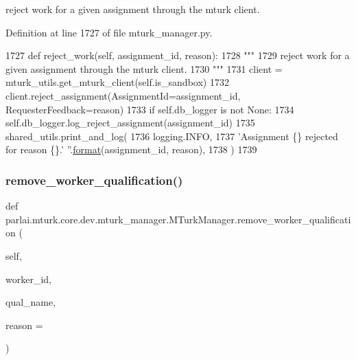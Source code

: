 \begin{DoxyVerb}reject work for a given assignment through the mturk client.
\end{DoxyVerb}
 

Definition at line 1727 of file mturk\+\_\+manager.\+py.


\begin{DoxyCode}
1727     \textcolor{keyword}{def }reject\_work(self, assignment\_id, reason):
1728         \textcolor{stringliteral}{"""}
1729 \textcolor{stringliteral}{        reject work for a given assignment through the mturk client.}
1730 \textcolor{stringliteral}{        """}
1731         client = mturk\_utils.get\_mturk\_client(self.is\_sandbox)
1732         client.reject\_assignment(AssignmentId=assignment\_id, RequesterFeedback=reason)
1733         \textcolor{keywordflow}{if} self.db\_logger \textcolor{keywordflow}{is} \textcolor{keywordflow}{not} \textcolor{keywordtype}{None}:
1734             self.db\_logger.log\_reject\_assignment(assignment\_id)
1735         shared\_utils.print\_and\_log(
1736             logging.INFO,
1737             \textcolor{stringliteral}{'Assignment \{\} rejected for reason \{\}.'} \textcolor{stringliteral}{''}.\hyperlink{namespaceparlai_1_1chat__service_1_1services_1_1messenger_1_1shared__utils_a32e2e2022b824fbaf80c747160b52a76}{format}(assignment\_id, reason),
1738         )
1739 
\end{DoxyCode}
\mbox{\label{classparlai_1_1mturk_1_1core_1_1dev_1_1mturk__manager_1_1MTurkManager_af36071c43873823fdeebba1f6aa13bd1}} 
\subsubsection{\texorpdfstring{remove\+\_\+worker\+\_\+qualification()}{remove\_worker\_qualification()}}
{\footnotesize\ttfamily def parlai.\+mturk.\+core.\+dev.\+mturk\+\_\+manager.\+M\+Turk\+Manager.\+remove\+\_\+worker\+\_\+qualification (\begin{DoxyParamCaption}\item[{}]{self,  }\item[{}]{worker\+\_\+id,  }\item[{}]{qual\+\_\+name,  }\item[{}]{reason = {\ttfamily \textquotesingle{}\textquotesingle{}} }\end{DoxyParamCaption})}

